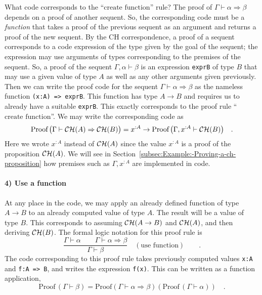 What code corresponds to the \textsf{``}$\text{create function}$\textsf{''} rule?
The proof of $\Gamma\vdash\alpha\Rightarrow\beta$ depends on a proof
of another sequent. So, the corresponding code must be a \emph{function}
that takes a proof of the previous sequent as an argument and returns
a proof of the new sequent. By the CH correspondence, a proof of a
sequent corresponds to a code expression of the type given by the
goal of the sequent; the expression may use arguments of types corresponding
to the premises of the sequent. So, a proof of the sequent $\Gamma,\alpha\vdash\beta$
is an expression \lstinline!exprB! of type $B$ that may use a given
value of type $A$ as well as any other arguments given previously.
Then we can write the proof code for the sequent $\Gamma\vdash\alpha\Rightarrow\beta$
as the nameless function \lstinline!(x:A) => exprB!. This function
has type $A\rightarrow B$ and requires us to already have a suitable
\lstinline!exprB!. This exactly corresponds to the proof rule \textsf{``}$\text{create function}$\textsf{''}.
We may write the corresponding code as
\[
\text{Proof}\,\big(\Gamma\vdash{\cal CH}(A)\Rightarrow{\cal CH}(B)\big)=x^{:A}\rightarrow\text{Proof}\,\big(\Gamma,x^{:A}\vdash{\cal CH}(B)\big)\quad.
\]
Here we wrote $x^{:A}$ instead of ${\cal CH}(A)$ since the value
$x^{:A}$ is a proof of the proposition ${\cal CH}(A)$. We will see
in Section~\ref{subsec:Example:-Proving-a-ch-proposition} how premises
such as $\Gamma,x^{:A}$ are implemented in code.

\paragraph{4) Use a function}

At any place in the code, we may apply an already defined function
of type $A\rightarrow B$ to an already computed value of type $A$.
The result will be a value of type $B$. This corresponds to assuming
${\cal CH}(A\rightarrow B)$ and ${\cal CH}(A)$, and then deriving
${\cal CH}(B)$. The formal logic notation for this proof rule is
\[
\frac{\Gamma\vdash\alpha\quad\quad\Gamma\vdash\alpha\Rightarrow\beta}{\Gamma\vdash\beta}\quad(\text{use function})\quad\quad.
\]
The code corresponding to this proof rule takes previously computed
values \lstinline!x:A! and \lstinline!f:A => B!, and writes the
expression \lstinline!f(x)!. This can be written as a function application,
\[
\text{Proof}\,(\Gamma\vdash\beta)=\text{Proof}\left(\Gamma\vdash\alpha\Rightarrow\beta\right)(\text{Proof}\,(\Gamma\vdash\alpha))\quad.
\]


